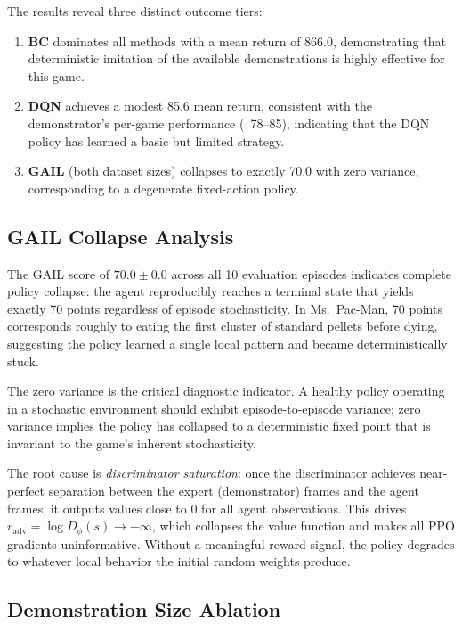 \documentclass[conference]{IEEEtran}
\begin{document}
The results reveal three distinct outcome tiers:

\begin{enumerate}
  \item \textbf{BC} dominates all methods with a mean return of 866.0, demonstrating
        that deterministic imitation of the available demonstrations is highly effective
        for this game.
  \item \textbf{DQN} achieves a modest 85.6 mean return, consistent with the
        demonstrator's per-game performance (~78--85), indicating that the DQN policy
        has learned a basic but limited strategy.
  \item \textbf{GAIL} (both dataset sizes) collapses to exactly 70.0 with zero variance,
        corresponding to a degenerate fixed-action policy.
\end{enumerate}

\subsection{GAIL Collapse Analysis}

The GAIL score of $70.0 \pm 0.0$ across all 10 evaluation episodes indicates complete
policy collapse: the agent reproducibly reaches a terminal state that yields exactly 70
points regardless of episode stochasticity.
In Ms.\ Pac-Man, 70 points corresponds roughly to eating the first cluster of standard
pellets before dying, suggesting the policy learned a single local pattern and became
deterministically stuck.

The zero variance is the critical diagnostic indicator.
A healthy policy operating in a stochastic environment should exhibit episode-to-episode
variance; zero variance implies the policy has collapsed to a deterministic fixed point
that is invariant to the game's inherent stochasticity.

The root cause is \emph{discriminator saturation}: once the discriminator achieves near-
perfect separation between the expert (demonstrator) frames and the agent frames, it
outputs values close to 0 for all agent observations.
This drives $r_{\text{adv}} = \log D_\phi(s) \to -\infty$, which collapses the value
function and makes all PPO gradients uninformative.
Without a meaningful reward signal, the policy degrades to whatever local behavior
the initial random weights produce.

\subsection{Demonstration Size Ablation}
\end{document}
